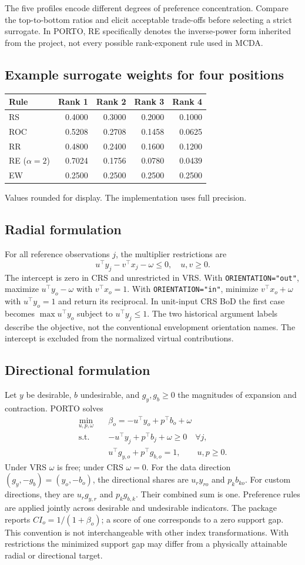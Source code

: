 \documentclass[10pt,a4paper]{article}
\newcommand{\field}[1]{\needspace{3\baselineskip}\subsection*{#1}}
\begin{document}
\par The five profiles encode different degrees of preference concentration. Compare the top-to-bottom ratios and elicit acceptable trade-offs before selecting a strict surrogate. In PORTO, RE specifically denotes the inverse-power form inherited from the project, not every possible rank-exponent rule used in MCDA.
\field{Example surrogate weights for four positions}
\begin{tabular}{@{}lrrrr@{}}\toprule Rule & Rank 1 & Rank 2 & Rank 3 & Rank 4 \\ \midrule
RS & 0.4000 & 0.3000 & 0.2000 & 0.1000 \\
ROC & 0.5208 & 0.2708 & 0.1458 & 0.0625 \\
RR & 0.4800 & 0.2400 & 0.1600 & 0.1200 \\
RE ($\alpha=2$) & 0.7024 & 0.1756 & 0.0780 & 0.0439 \\
EW & 0.2500 & 0.2500 & 0.2500 & 0.2500 \\
\bottomrule\end{tabular}
\par Values rounded for display. The implementation uses full precision.
\field{Radial formulation}
For all reference observations $j$, the multiplier restrictions are
\[
u^\top y_j-v^\top x_j-\omega\leq 0,\quad u,v\geq 0.
\]
The intercept is zero in CRS and unrestricted in VRS. With \texttt{ORIENTATION="out"}, maximize $u^\top y_o-\omega$ with $v^\top x_o=1$. With \texttt{ORIENTATION="in"}, minimize $v^\top x_o+\omega$ with $u^\top y_o=1$ and return its reciprocal. In unit-input CRS BoD the first case becomes $\max u^\top y_o$ subject to $u^\top y_j\leq1$. The two historical argument labels describe the objective, not the conventional envelopment orientation names. The intercept is excluded from the normalized virtual contributions.
\field{Directional formulation}
Let $y$ be desirable, $b$ undesirable, and $g_y,g_b\geq0$ the magnitudes of expansion and contraction. PORTO solves
\begin{align*}
\min_{u,p,\omega}\quad &\beta_o=-u^\top y_o+p^\top b_o+\omega\\
\text{s.t.}\quad &-u^\top y_j+p^\top b_j+\omega\geq0\quad\forall j,\\
&u^\top g_{y,o}+p^\top g_{b,o}=1,\qquad u,p\geq0.
\end{align*}
Under VRS $\omega$ is free; under CRS $\omega=0$. For the data direction $(g_y,-g_b)=(y_o,-b_o)$, the directional shares are $u_r y_{ro}$ and $p_k b_{ko}$. For custom directions, they are $u_r g_{y,r}$ and $p_k g_{b,k}$. Their combined sum is one. Preference rules are applied jointly across desirable and undesirable indicators. The package reports $CI_o=1/(1+\beta_o)$; a score of one corresponds to a zero support gap. This convention is not interchangeable with other index transformations. With restrictions the minimized support gap may differ from a physically attainable radial or directional target.
\end{document}
